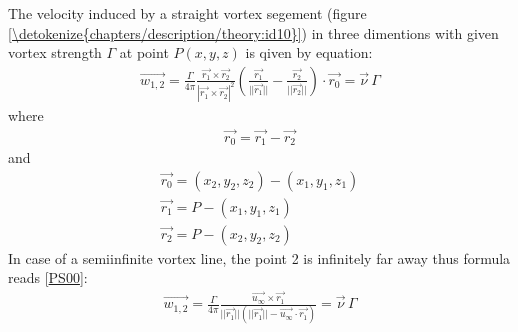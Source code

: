 \documentclass[letterpaper,10pt,english]{jupyterBook}
\begin{document}
\sphinxAtStartPar
The velocity induced by a straight vortex segement (figure \hyperref[\detokenize{chapters/description/theory:id10}]{\ref{\detokenize{chapters/description/theory:id10}}}) in three dimentions with given vortex strength \(\Gamma\) at point \(P(x,y,z)\) is qiven by equation:
\begin{equation}\label{equation:chapters/description/theory:q_finite}
\begin{split}
\overrightarrow{w_{1,2}} = \frac{\Gamma}{4\pi}\frac{\overrightarrow{r_1} \times \overrightarrow{r_2}}{|\overrightarrow{r_1} \times \overrightarrow{r_2}|^2} \left(\frac{\overrightarrow{r_1}}{||\overrightarrow{r_1}||} - \frac{\overrightarrow{r_2}}{||\overrightarrow{r_2}||}\right) \cdot\overrightarrow{r_0}=\overrightarrow{\nu}\,\Gamma
\end{split}
\end{equation}
\sphinxAtStartPar
where
\begin{equation*}
\begin{split}
\overrightarrow{r_{0}} = \overrightarrow{r_1} - \overrightarrow{r_2}
\end{split}
\end{equation*}
\sphinxAtStartPar
and
\begin{gather*}
\overrightarrow{r_{0}} = (x_2, y_2, z_2) - (x_1, y_1, z_1) \\
\overrightarrow{r_{1}} = P - (x_1, y_1, z_1)\\
\overrightarrow{r_{2}} = P - (x_2, y_2, z_2)
\end{gather*}
\sphinxAtStartPar
In case of a semi\sphinxhyphen{}infinite vortex line, the point 2 is infinitely far away thus formula reads {[}\hyperlink{cite.chapters/bibliography:id8}{PS00}{]}:
\begin{equation}\label{equation:chapters/description/theory:q_infinite}
\begin{split}
\overrightarrow{w_{1,2}} = \frac{\Gamma}{4\pi}\frac{\overrightarrow{u_\infty} \times \overrightarrow{r_1}}{||\overrightarrow{r_1}||(||\overrightarrow{r_1}|| - \overrightarrow{u_\infty} \cdot \overrightarrow{r_1})}=\overrightarrow{\nu}\,\Gamma
\end{split}
\end{equation}
\end{document}
